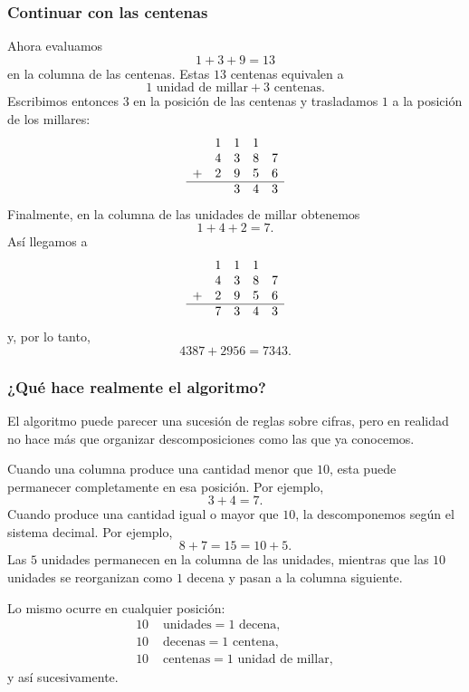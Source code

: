\subsubsection*{Continuar con las centenas}

Ahora evaluamos
\[
1+3+9=13
\]
en la columna de las centenas.
Estas \(13\) centenas equivalen a
\[
1\text{ unidad de millar}+3\text{ centenas}.
\]
Escribimos entonces \(3\) en la posición de las centenas y trasladamos \(1\) a la posición de los millares:
\[
\begin{array}{rrrrr}
 & 1 & 1 & 1 &  \\
 & 4 & 3 & 8 & 7\\
+& 2 & 9 & 5 & 6\\
\hline
 &   & 3 & 4 & 3
\end{array}
\]
Finalmente, en la columna de las unidades de millar obtenemos
\[
1+4+2=7.
\]
Así llegamos a
\[
\begin{array}{rrrrr}
 & 1 & 1 & 1 &  \\
 & 4 & 3 & 8 & 7\\
+& 2 & 9 & 5 & 6\\
\hline
 & 7 & 3 & 4 & 3
\end{array}
\]
y, por lo tanto,
\[
4387+2956=7343.
\]

\subsubsection*{¿Qué hace realmente el algoritmo?}

El algoritmo puede parecer una sucesión de reglas sobre cifras, pero en realidad no hace más que organizar descomposiciones como las que ya conocemos.

Cuando una columna produce una cantidad menor que \(10\), esta puede permanecer completamente en esa posición. Por ejemplo,
\[
3+4=7.
\]
Cuando produce una cantidad igual o mayor que \(10\), la descomponemos según el sistema decimal. Por ejemplo,
\[
8+7=15=10+5.
\]
Las \(5\) unidades permanecen en la columna de las unidades, mientras que las \(10\) unidades se reorganizan como \(1\) decena y pasan a la columna siguiente.

Lo mismo ocurre en cualquier posición:
\begin{align*}
  10&\text{ unidades}=1\text{ decena},\\
  10&\text{ decenas}=1\text{ centena},\\
  10&\text{ centenas}=1\text{ unidad de millar},
\end{align*}
y así sucesivamente.

